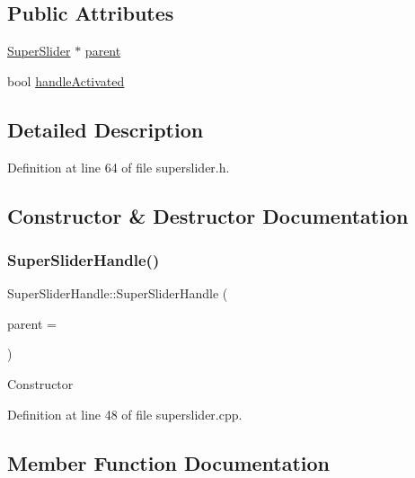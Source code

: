 \subsection*{Public Attributes}
\begin{DoxyCompactItemize}
\item 
\hyperlink{class_super_slider}{Super\+Slider} $\ast$ \hyperlink{class_super_slider_handle_ae7159611443ea36306dab546ea939212}{parent}
\item 
bool \hyperlink{class_super_slider_handle_a57621665613ebd303a0b2aa4c5134b38}{handle\+Activated}
\end{DoxyCompactItemize}


\subsection{Detailed Description}


Definition at line 64 of file superslider.\+h.



\subsection{Constructor \& Destructor Documentation}
\mbox{\label{class_super_slider_handle_ae4c35dc37f3ec823934fe0150015c0e2}} 
\subsubsection{\texorpdfstring{Super\+Slider\+Handle()}{SuperSliderHandle()}}
{\footnotesize\ttfamily Super\+Slider\+Handle\+::\+Super\+Slider\+Handle (\begin{DoxyParamCaption}\item[{\hyperlink{class_super_slider}{Super\+Slider} $\ast$}]{parent = {} }\end{DoxyParamCaption})}

Constructor 

Definition at line 48 of file superslider.\+cpp.



\subsection{Member Function Documentation}
\mbox{\label{class_super_slider_handle_a9d22009e1ffe51eb8e3d8595843618b6}} 
